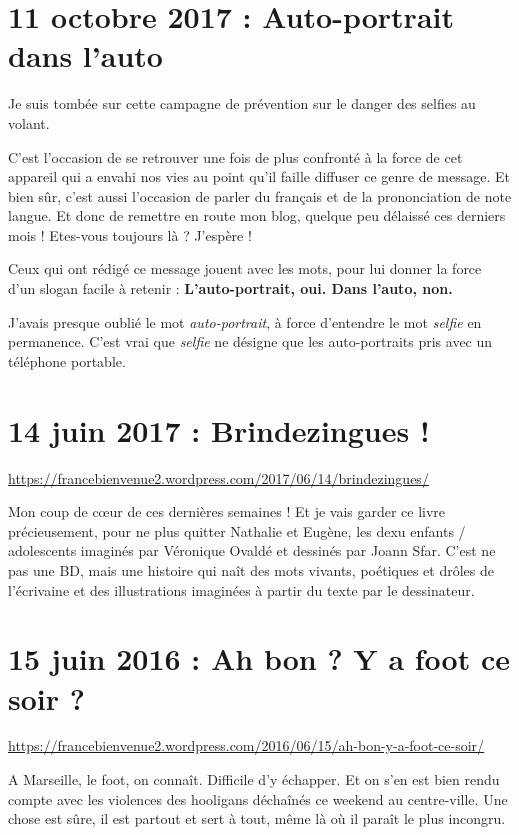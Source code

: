 \documentclass[11pt, french]{report}
\begin{document}
\chapter{11 octobre 2017 : Auto-portrait dans l'auto}

\vfill

Je suis tombée sur cette campagne de prévention sur le danger des
selfies au volant.

C'est l'occasion de se retrouver une fois de plus confronté à la force
de cet appareil qui a envahi nos vies au point qu'il faille diffuser
ce genre de message. Et bien sûr, c'est aussi l'occasion de parler du
français et de la prononciation de note langue. Et donc de remettre en
route mon blog, quelque peu délaissé ces derniers mois ! Etes-vous
toujours là ? J'espère !

Ceux qui ont rédigé ce message jouent avec les mots, pour lui donner
la force d'un slogan facile à retenir : \textbf{L'auto-portrait, oui. Dans
  l'auto, non.}

J'avais presque oublié le mot \textit{auto-portrait}, à force
d'entendre le mot \textit{selfie} en permanence. C'est vrai que
\textit{selfie} ne désigne que les auto-portraits pris avec un
téléphone portable.

\vfill

\chapter{14 juin 2017 : Brindezingues !}

\url{https://francebienvenue2.wordpress.com/2017/06/14/brindezingues/}

\vfill

Mon coup de cœur de ces dernières semaines ! Et je vais garder ce livre précieusement, pour ne
plus quitter Nathalie et Eugène, les dexu enfants / adolescents imaginés par Véronique Ovaldé
et dessinés par Joann Sfar. C'est ne pas une BD, mais une histoire qui naît des mots vivants,
poétiques et drôles de l'écrivaine et des illustrations imaginées à partir du texte par le
dessinateur.

\chapter{15 juin 2016 : Ah bon ? Y a foot ce soir ?}

\url{https://francebienvenue2.wordpress.com/2016/06/15/ah-bon-y-a-foot-ce-soir/}

\vfill

A Marseille, le foot, on connaît. Difficile d’y échapper. Et on s’en est bien
rendu compte avec les violences des hooligans déchaînés ce weekend au centre-ville.
Une chose est sûre, il est partout et sert à tout, même là où il paraît le plus
incongru.
\end{document}

